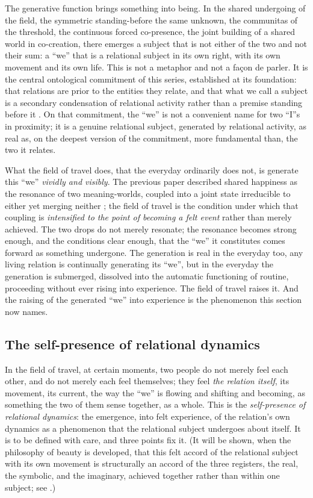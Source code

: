 The generative function brings something into being. In the shared undergoing of the field, the symmetric standing-before the same unknown, the communitas of the threshold, the continuous forced co-presence, the joint building of a shared world in co-creation, there emerges a subject that is not either of the two and not their sum: a ``we'' that is a relational subject in its own right, with its own movement and its own life. This is not a metaphor and not a fa\c{c}on de parler. It is the central ontological commitment of this series, established at its foundation: that relations are prior to the entities they relate, and that what we call a subject is a secondary condensation of relational activity rather than a premise standing before it \parencite{wan2024grb}. On that commitment, the ``we'' is not a convenient name for two ``I''s in proximity; it is a genuine relational subject, generated by relational activity, as real as, on the deepest version of the commitment, more fundamental than, the two it relates.

What the field of travel does, that the everyday ordinarily does not, is generate this ``we'' \emph{vividly and visibly}. The previous paper described shared happiness as the resonance of two meaning-worlds, coupled into a joint state irreducible to either yet merging neither \parencite{paperxix}; the field of travel is the condition under which that coupling is \emph{intensified to the point of becoming a felt event} rather than merely achieved. The two drops do not merely resonate; the resonance becomes strong enough, and the conditions clear enough, that the ``we'' it constitutes comes forward as something undergone. The generation is real in the everyday too, any living relation is continually generating its ``we'', but in the everyday the generation is submerged, dissolved into the automatic functioning of routine, proceeding without ever rising into experience. The field of travel raises it. And the raising of the generated ``we'' into experience is the phenomenon this section now names.

\subsection{The self-presence of relational dynamics}
\label{p21:sub:sp-selfpresence}

In the field of travel, at certain moments, two people do not merely feel each other, and do not merely each feel themselves; they feel \emph{the relation itself}, its movement, its current, the way the ``we'' is flowing and shifting and becoming, as something the two of them sense together, as a whole. This is the \emph{self-presence of relational dynamics}: the emergence, into felt experience, of the relation's own dynamics as a phenomenon that the relational subject undergoes about itself. It is to be defined with care, and three points fix it. (It will be shown, when the philosophy of beauty is developed, that this felt accord of the relational subject with its own movement is structurally an accord of the three registers, the real, the symbolic, and the imaginary, achieved together rather than within one subject; see .)

